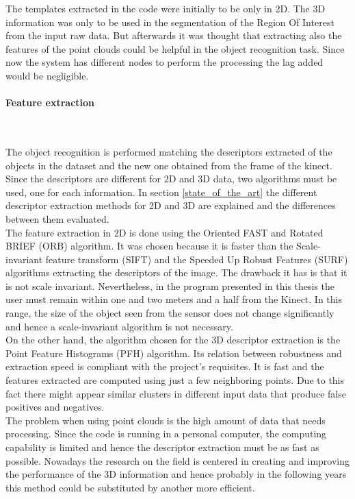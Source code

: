 The templates extracted in the code were initially to be only in 2D. 
The 3D information was only to be used in the segmentation of the Region Of Interest from the input raw data. 
But afterwards it was thought that extracting also the features of the point clouds could be helpful in the object recognition task. 
Since now the system has different nodes to perform the processing the lag added would be negligible. 
\\

\paragraph{Feature extraction}
\mbox{} \\
	\label{feature_extraction}

The object recognition is performed matching the descriptors extracted of the objects in the dataset and the new one obtained from the frame of the kinect. 
Since the descriptors are different for 2D and 3D data, two algorithms must be used, one for each information. 
In section \ref{state_of_the_art} the different descriptor extraction methods for 2D and 3D are explained and the differences between them evaluated. 
\\

The feature extraction in 2D is done using the Oriented FAST and Rotated BRIEF (ORB) \cite{orb} algorithm. 
It was chosen because it is faster than the Scale-invariant feature transform (SIFT) \cite{sift} and the Speeded Up Robust Features (SURF) \cite{surf} algorithms extracting the descriptors of the image. 
The drawback it has is that it is not scale invariant. 
Nevertheless, in the program presented in this thesis the user must remain within one and two meters and a half from the Kinect. 
In this range, the size of the object seen from the sensor does not change significantly and hence a scale-invariant algorithm is not necessary. 
\\

On the other hand, the algorithm chosen for the 3D descriptor extraction is the Point Feature Histograms (PFH) \cite{Rusu} algorithm. 
Its relation between robustness and extraction speed is compliant with the project's requisites. It is fast and the features extracted are computed using just a few neighboring points. Due to this fact there might appear similar clusters in different input data that produce false positives and negatives. 
\\
\newpage
The problem when using point clouds is the high amount of data that needs processing. Since the code is running in a personal computer, the computing capability is limited and hence the descriptor extraction must be as fast as possible. Nowadays the research on the field is centered in creating and improving the performance of the 3D information and hence probably in the following years this method could be substituted by another more efficient.  
